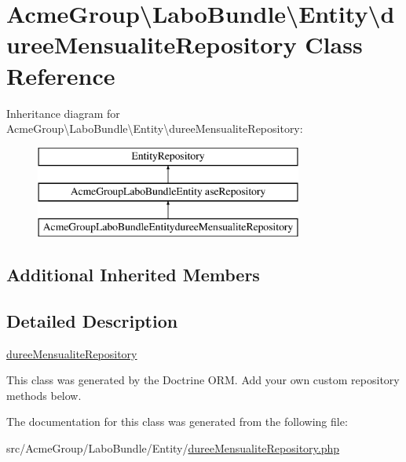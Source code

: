 \hypertarget{class_acme_group_1_1_labo_bundle_1_1_entity_1_1duree_mensualite_repository}{\section{Acme\+Group\textbackslash{}Labo\+Bundle\textbackslash{}Entity\textbackslash{}duree\+Mensualite\+Repository Class Reference}
\label{class_acme_group_1_1_labo_bundle_1_1_entity_1_1duree_mensualite_repository}
}
Inheritance diagram for Acme\+Group\textbackslash{}Labo\+Bundle\textbackslash{}Entity\textbackslash{}duree\+Mensualite\+Repository\+:\begin{figure}[H]
\begin{center}
\leavevmode
\includegraphics[height=3.000000cm]{class_acme_group_1_1_labo_bundle_1_1_entity_1_1duree_mensualite_repository}
\end{center}
\end{figure}
\subsection*{Additional Inherited Members}


\subsection{Detailed Description}
\hyperlink{class_acme_group_1_1_labo_bundle_1_1_entity_1_1duree_mensualite_repository}{duree\+Mensualite\+Repository}

This class was generated by the Doctrine O\+R\+M. Add your own custom repository methods below. 

The documentation for this class was generated from the following file\+:\begin{DoxyCompactItemize}
\item 
src/\+Acme\+Group/\+Labo\+Bundle/\+Entity/\hyperlink{duree_mensualite_repository_8php}{duree\+Mensualite\+Repository.\+php}\end{DoxyCompactItemize}
